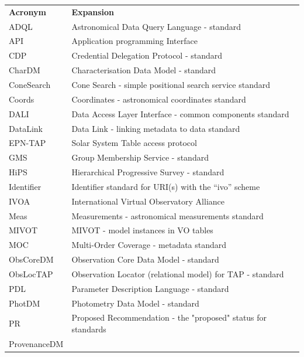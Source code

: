 \documentclass[11pt,letter]{ivoa}
\begin{document}
{\begin{longtable}[t]{l l}
        \sptablerule
        \textbf{Acronym} & \textbf{Expansion} \\
        \sptablerule
        {ADQL} & 
        {Astronomical Data Query Language - standard} \\
        {API} & 
        {Application programming Interface} \\
        {CDP} &
        {Credential Delegation Protocol - standard} \\
        {CharDM} &
        {Characterisation Data Model - standard} \\
        {ConeSearch} &
        {Cone Search - simple positional search service standard} \\
        {Coords} &
        {Coordinates - astronomical coordinates standard} \\
        {DALI} &
        {Data Access Layer Interface - common components standard} \\
        {DataLink} &
        {Data Link - linking metadata to data standard} \\
       {EPN-TAP} &
       {Solar System Table access protocol} \\
        {GMS} &
        {Group Membership Service - standard} \\
        {HiPS} &
        {Hierarchical Progressive Survey - standard} \\
        {Identifier} &
        {Identifier standard for URI(s) with the ``ivo'' scheme} \\
        {IVOA} &
        {International Virtual Observatory Alliance} \\
        {Meas} &
        {Measurements - astronomical measurements standard} \\
        {MIVOT} &
        {MIVOT - model instances in VO tables} \\
        {MOC} &
        {Multi-Order Coverage - metadata standard} \\
        {ObsCoreDM} &
        {Observation Core Data Model - standard} \\
        {ObsLocTAP}  &
        {Observation Locator (relational model) for TAP - standard} \\
        {PDL} &
        {Parameter Description Language - standard} \\
        {PhotDM} &
        {Photometry Data Model - standard} \\
        {PR} &
{Proposed Recommendation - the "proposed" status for standards} \\        {ProvenanceDM} &

\end{longtable}}
\end{document}
